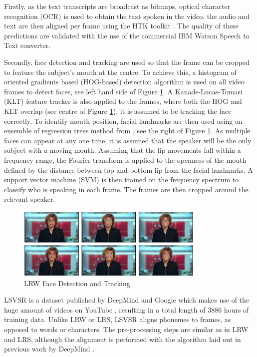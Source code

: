 \documentclass[12pt]{report}
\begin{document}
Firstly, as the text transcripts are broadcast as bitmaps, optical character recognition (OCR) \cite{Buehler2009} is used to obtain the text spoken in the video, the audio and text are then aligned per frame using the HTK toolkit \cite{Woodland1995}.
The quality of these predictions are validated with the use of the commercial IBM Watson Speech to Text converter.

Secondly, face detection and tracking are used so that the frame can be cropped to feature the subject's mouth at the centre.
To achieve this, a histogram of oriented gradients based (HOG-based) detection algorithm \cite{King2009} is used on all video frames to detect faces, see left hand side of Figure \ref{fig:LRW_Face_Detection}.
A Kanade-Lucas-Tomasi (KLT) feature tracker is also applied to the frames, where both the HOG and KLT overlap (see centre of Figure \ref{fig:LRW_Face_Detection}), it is assumed to be tracking the face correctly.
To identify mouth position, facial landmarks are then used using an ensemble of regression trees method from \cite{Kazemi2014}, see the right of Figure \ref{fig:LRW_Face_Detection}.
As multiple faces can appear at any one time, it is assumed that the speaker will be the only subject with a moving mouth.
Assuming that the lip movements fall within a frequency range, the Fourier transform is applied to the openness of the mouth defined by the distance between top and bottom lip from the facial landmarks.
A support vector machine (SVM) is then trained on the frequency spectrum to classify who is speaking in each frame.
The frames are then cropped around the relevant speaker.

\begin{figure}[h]
    \centering
        \includegraphics[width=0.8\textwidth]{figures/lrw_face_detection.png}
    \caption{LRW Face Detection and Tracking \cite{Chung2016}}\label{fig:LRW_Face_Detection}
\end{figure}

LSVSR is a dataset published by DeepMind and Google which makes use of the huge amount of videos on YouTube \cite{Shillingford2018}, resulting in a total length of 3886 hours of training data.
Unlike LRW or LRS, LSVSR aligns phonemes to frames, as opposed to words or characters.
The pre-processing steps are similar as in LRW and LRS, although the alignment is performed with the algorithm laid out in previous work by DeepMind \cite{Liao2013}.
\end{document}
